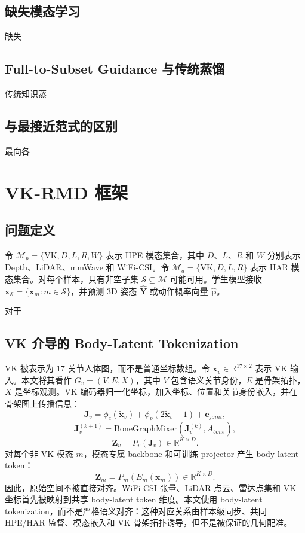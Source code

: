 \documentclass[UTF8,twocolumn]{ctexart}
\newcommand{\method}{VK-RMD}
\begin{document}
\subsection{缺失模态学习}
缺失

\subsection{Full-to-Subset Guidance 与传统蒸馏}
传统知识蒸

\subsection{与最接近范式的区别}
最向各
\section{\method{} 框架}
\subsection{问题定义}
令 $\mathcal{M}_{p}=\{\mathrm{VK},D,L,R,W\}$ 表示 HPE 模态集合，其中 $D$、$L$、$R$ 和 $W$ 分别表示 Depth、LiDAR、mmWave 和 WiFi-CSI。令 $\mathcal{M}_{a}=\{\mathrm{VK},D,L,R\}$ 表示 HAR 模态集合。对每个样本，只有非空子集 $\mathcal{S}\subseteq \mathcal{M}$ 可能可用。学生模型接收 $\mathbf{x}_{\mathcal{S}}=\{\mathbf{x}_{m}:m\in\mathcal{S}\}$，并预测 3D 姿态 $\hat{\mathbf{Y}}$ 或动作概率向量 $\hat{\mathbf{p}}$。

对于 

\subsection{VK 介导的 Body-Latent Tokenization}
VK 被表示为 17 关节人体图，而不是普通坐标数组。令 $\mathbf{x}_{v}\in\mathbb{R}^{17\times 2}$ 表示 VK 输入。本文将其看作 $G_v=(V,E,X)$，其中 $V$ 包含语义关节身份，$E$ 是骨架拓扑，$X$ 是坐标观测。VK 编码器归一化坐标，加入坐标、位置和关节身份嵌入，并在骨架图上传播信息：
\begin{equation}
    \mathbf{J}_{v}=\phi_c(\tilde{\mathbf{x}}_v)+\phi_p(2\tilde{\mathbf{x}}_v-1)+\mathbf{e}_{joint},
\end{equation}
\begin{equation}
    \mathbf{J}_{v}^{(k+1)}=\mathrm{BoneGraphMixer}(\mathbf{J}_{v}^{(k)}, A_{bone}),
\end{equation}
\begin{equation}
    \mathbf{Z}_{v}=P_v(\mathbf{J}_v)\in\mathbb{R}^{K\times D}.
\end{equation}
对每个非 VK 模态 $m$，模态专属 backbone 和可训练 projector 产生 body-latent token：
\begin{equation}
    \mathbf{Z}_{m}=P_m(E_m(\mathbf{x}_m))\in\mathbb{R}^{K\times D}.
\end{equation}
因此，原始空间不被直接对齐。WiFi-CSI 张量、LiDAR 点云、雷达点集和 VK 坐标首先被映射到共享 body-latent token 维度。本文使用 body-latent tokenization，而不是严格语义对齐：这种对应关系由样本级同步、共同 HPE/HAR 监督、模态嵌入和 VK 骨架拓扑诱导，但不是被保证的几何配准。
\end{document}
